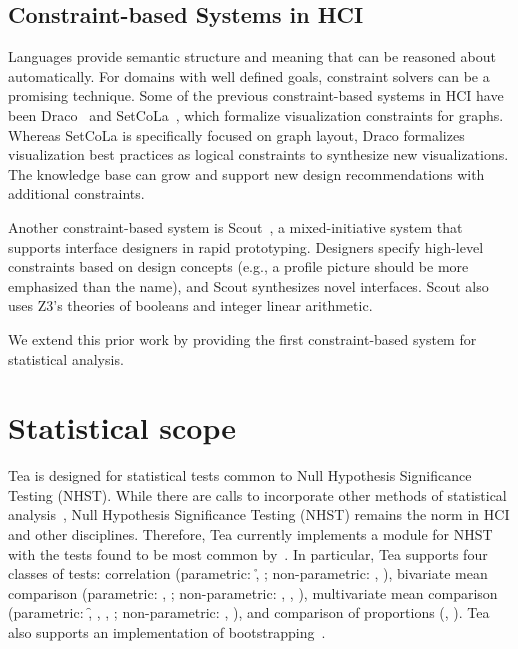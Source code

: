 \subsection{Constraint-based Systems in HCI}
Languages provide semantic structure and meaning that can be reasoned about
automatically. For domains with well defined goals, constraint solvers can be a
promising technique. Some of the previous constraint-based systems in HCI have
been Draco~\cite{moritz2019formalizing} and SetCoLa~\cite{hoffswell2018setcola},
which formalize visualization constraints for graphs. Whereas SetCoLa is
specifically focused on graph layout, Draco formalizes visualization best
practices as logical constraints to synthesize new visualizations. The knowledge
base can grow and support new design recommendations with
additional constraints.


Another constraint-based system is Scout~\cite{swearngin2018scout}, a mixed-initiative system that supports
interface designers in rapid prototyping. Designers specify high-level 
constraints based on design concepts (e.g., a profile picture should be more
emphasized than the name), and Scout synthesizes novel interfaces. Scout also uses
Z3's theories of booleans and integer linear arithmetic. %

We extend this prior work by providing the first constraint-based system for statistical analysis. 


\section{Statistical scope}
Tea is designed for statistical tests common to Null Hypothesis Significance
Testing (NHST). While there are calls to incorporate other methods of
statistical analysis~\cite{kay2016researcher,kaptein2012rethinking}, Null
Hypothesis Significance Testing (NHST) remains the norm in HCI and other
disciplines. Therefore, Tea currently implements a module for NHST with the
tests found to be most common by~\cite{wacharamanotham2015statsplorer}. In
particular, Tea supports four classes of tests: correlation (parametric: \r,
\pb; non-parametric: \ktau, \srho), bivariate mean comparison (parametric:
\student, \paired; non-parametric: \mannu, \wilcox, \welch), multivariate mean
comparison (parametric: \f, \rm, \facANOVA, \twoANOVA; non-parametric: \kw,
\friedman), and comparison of proportions (\chiSq, \fisher). Tea also supports
an implementation of bootstrapping~\cite{efron1992bootstrap}.

